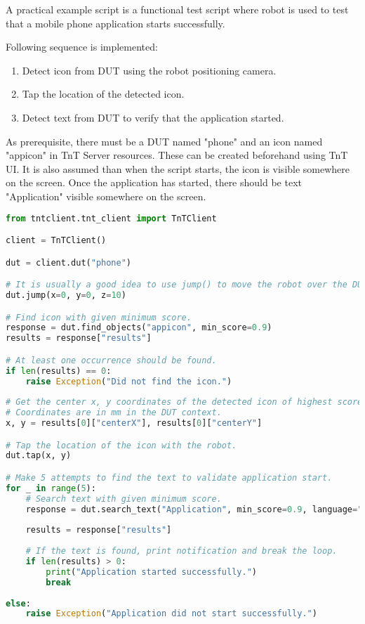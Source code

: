 A practical example script is a functional test script where robot is used to test that a mobile phone application starts successfully.

Following sequence is implemented:

\begin{enumerate}
\item Detect icon from DUT using the robot positioning camera.
\item Tap the location of the detected icon.
\item Detect text from DUT to verify that the application started.
\end{enumerate}

As prerequisite, there must be a DUT named "phone" and an icon named "appicon" in TnT Server resources. These can be created beforehand using TnT UI. It is also assumed than when the script starts, the icon is visible somewhere on the screen. Once the application has started, there should be text "Application" visible somewhere on the screen.

\begin{lstlisting}[language=Python]
from tntclient.tnt_client import TnTClient

client = TnTClient()

dut = client.dut("phone")

# It is usually a good idea to use jump() to move the robot over the DUT from current position.
dut.jump(x=0, y=0, z=10)

# Find icon with given minimum score.
response = dut.find_objects("appicon", min_score=0.9)
results = response["results"]

# At least one occurrence should be found.
if len(results) == 0:
    raise Exception("Did not find the icon.")
	
# Get the center x, y coordinates of the detected icon of highest score.
# Coordinates are in mm in the DUT context.
x, y = results[0]["centerX"], results[0]["centerY"]

# Tap the location of the icon with the robot.
dut.tap(x, y)

# Make 5 attempts to find the text to validate application start.
for _ in range(5):
    # Search text with given minimum score.
    response = dut.search_text("Application", min_score=0.9, language="English")
  
    results = response["results"]
  
    # If the text is found, print notification and break the loop.
    if len(results) > 0:
        print("Application started successfully.")
        break
    
else:
    raise Exception("Application did not start successfully.")
\end{lstlisting}


